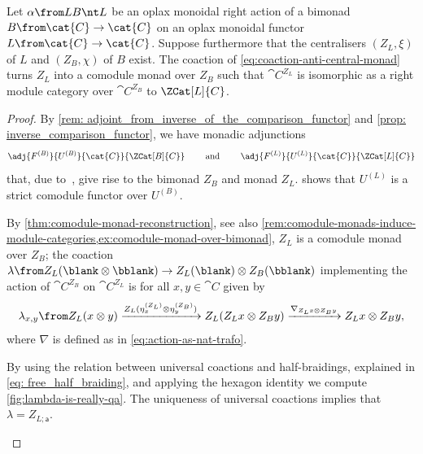 \begin{proposition}\label{prop: construction_anti_central_comonad}
  Let \(\alpha \from LB \nt L\) be an oplax monoidal right action of a bimonad \(B \from \cat{C} \to \cat{C}\) on an oplax monoidal functor \(L \from \cat{C} \to \cat{C}\).
  Suppose furthermore that the centralisers \((Z_L, \xi)\) of \(L\)  and  \((Z_B, \chi)\) of \(B\) exist.
  The coaction of \cref{eq:coaction-anti-central-monad} turns \(Z_L\) into a comodule monad over \(Z_B\) such that \(\cat{C}^{Z_L}\) is isomorphic as a right module category over \(\cat{C}^{Z_B}\) to \(\ZCat[L]{C}\).
\end{proposition}
\begin{proof}
  By \cref{rem: adjoint_from_inverse_of_the_comparison_functor}
  and \cref{prop: inverse_comparison_functor},
  we have monadic adjunctions
  \[
    \adj{F^{(B)}}{U^{(B)}}{\cat{C}}{\ZCat[B]{C}}
    \qquad \text{ and } \qquad
    \adj{F^{(L)}}{U^{(L)}}{\cat{C}}{\ZCat[L]{C}}
  \]
  that, due to~\cite[Remark~5.13]{Bruguieres2012},
  give rise to the bimonad \(Z_B\) and monad \(Z_L\).
   shows that
  \(U^{(L)}\) is a strict comodule functor over \(U^{(B)}\).


  By  \cref{thm:comodule-monad-reconstruction},
  see also \cref{rem:comodule-monads-induce-module-categories,ex:comodule-monad-over-bimonad},
  \(Z_L\) is a comodule monad over \(Z_{B}\);
  the coaction \(\lambda \from Z_L(\blank \otimes \bblank) \to Z_L(\blank) \otimes Z_B(\bblank)\) implementing the action of \(\cat{C}^{Z_B}\) on \(\cat{C}^{Z_L}\) is for all \(x, y \in \cat{C}\) given by
  \[
    \lambda_{x,y}\from Z_L(x \otimes y)
    \xrightarrow{Z_L(\eta^{(Z_L)}_{x} \otimes \eta^{(Z_B)}_{y})} Z_L(Z_L x \otimes Z_B y)
    \xrightarrow{\nabla_{Z_L x \otimes Z_B y}} Z_L x \otimes Z_B y,
  \]
  where \(\nabla\) is defined as in \cref{eq:action-as-nat-trafo}.

  By using the relation between universal coactions and half-braidings,
  explained in \cref{eq: free_half_braiding},
  and applying the hexagon identity we compute \cref{fig:lambda-is-really-qa}.
  The uniqueness of universal coactions implies that \(\lambda = Z_{L;\mathsf{a}}\).
  \begin{figure}[htbp]
    \centering
    \vspace{-0.2cm}\vspace{-\onelineskip}%
  \end{figure}


\end{proof}
